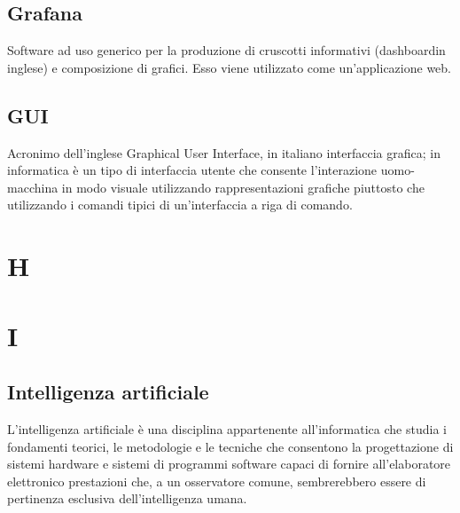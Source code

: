 \subsection*{Grafana}
Software ad uso generico per la produzione di cruscotti informativi (dashboard\glosp in inglese) e composizione di grafici. Esso viene utilizzato come un'applicazione web.

\subsection*{GUI}
Acronimo dell'inglese Graphical User Interface, in italiano interfaccia grafica; in informatica è un tipo di interfaccia utente che consente l'interazione uomo-macchina in modo visuale utilizzando rappresentazioni grafiche piuttosto che utilizzando i comandi tipici di un'interfaccia a riga di comando.

\clearpage
\section*{H}



\clearpage
\section*{I}
\subsection*{Intelligenza artificiale}
L'intelligenza artificiale è una disciplina appartenente all'informatica che studia i fondamenti teorici, le metodologie e le tecniche che consentono la progettazione di sistemi hardware e sistemi di programmi software capaci di fornire all'elaboratore elettronico prestazioni che, a un osservatore comune, sembrerebbero essere di pertinenza esclusiva dell'intelligenza umana.

